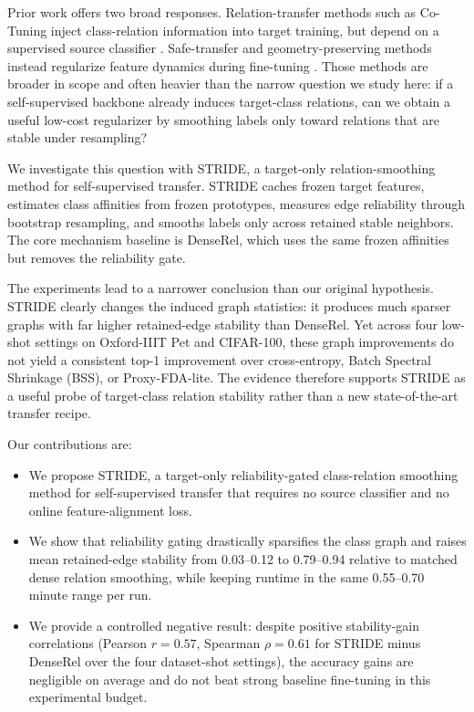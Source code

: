 \documentclass{article}
\newcommand{\method}{STRIDE\xspace}
\newcommand{\dense}{DenseRel\xspace}
\begin{document}
Prior work offers two broad responses. Relation-transfer methods such as Co-Tuning inject class-relation information into target training, but depend on a supervised source classifier \citep{you2020cotuning}. Safe-transfer and geometry-preserving methods instead regularize feature dynamics during fine-tuning \citep{chen2019bss,Zhou_2023_ICCV,yamaguchi2024adarand,huang2025proxy,chen2025preserve,zu2025exploring}. Those methods are broader in scope and often heavier than the narrow question we study here: if a self-supervised backbone already induces target-class relations, can we obtain a useful low-cost regularizer by smoothing labels only toward relations that are stable under resampling?

We investigate this question with \method, a target-only relation-smoothing method for self-supervised transfer. \method caches frozen target features, estimates class affinities from frozen prototypes, measures edge reliability through bootstrap resampling, and smooths labels only across retained stable neighbors. The core mechanism baseline is \dense, which uses the same frozen affinities but removes the reliability gate.

The experiments lead to a narrower conclusion than our original hypothesis. \method clearly changes the induced graph statistics: it produces much sparser graphs with far higher retained-edge stability than \dense. Yet across four low-shot settings on Oxford-IIIT Pet and CIFAR-100, these graph improvements do not yield a consistent top-1 improvement over cross-entropy, Batch Spectral Shrinkage (BSS), or Proxy-FDA-lite. The evidence therefore supports \method as a useful probe of target-class relation stability rather than a new state-of-the-art transfer recipe.

Our contributions are:
\begin{itemize}
  \item We propose \method, a target-only reliability-gated class-relation smoothing method for self-supervised transfer that requires no source classifier and no online feature-alignment loss.
  \item We show that reliability gating drastically sparsifies the class graph and raises mean retained-edge stability from 0.03--0.12 to 0.79--0.94 relative to matched dense relation smoothing, while keeping runtime in the same 0.55--0.70 minute range per run.
  \item We provide a controlled negative result: despite positive stability-gain correlations (Pearson $r=0.57$, Spearman $\rho=0.61$ for \method minus \dense over the four dataset-shot settings), the accuracy gains are negligible on average and do not beat strong baseline fine-tuning in this experimental budget.
\end{itemize}
\end{document}
